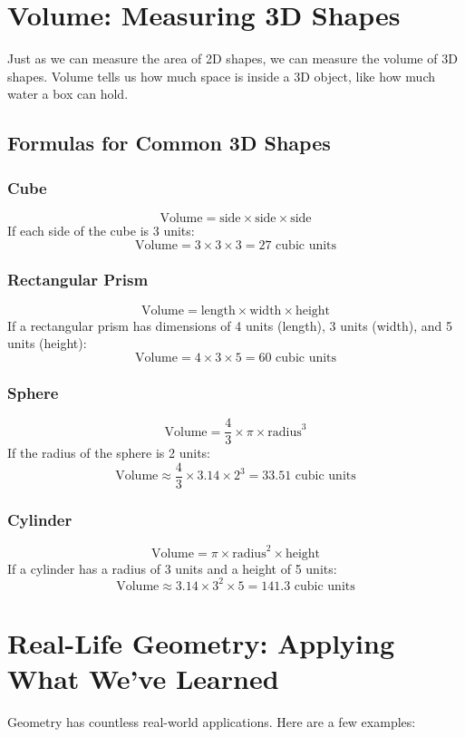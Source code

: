 \section{Volume: Measuring 3D Shapes}
Just as we can measure the area of 2D shapes, we can measure the volume of 3D shapes. Volume tells us how much space is inside a 3D object, like how much water a box can hold.

\subsection{Formulas for Common 3D Shapes}
\subsubsection{Cube}
\[
\text{Volume} = \text{side} \times \text{side} \times \text{side}
\]
If each side of the cube is 3 units:
\[
\text{Volume} = 3 \times 3 \times 3 = 27 \text{ cubic units}
\]

\subsubsection{Rectangular Prism}
\[
\text{Volume} = \text{length} \times \text{width} \times \text{height}
\]
If a rectangular prism has dimensions of 4 units (length), 3 units (width), and 5 units (height):
\[
\text{Volume} = 4 \times 3 \times 5 = 60 \text{ cubic units}
\]

\subsubsection{Sphere}
\[
\text{Volume} = \frac{4}{3} \times \pi \times \text{radius}^3
\]
If the radius of the sphere is 2 units:
\[
\text{Volume} \approx \frac{4}{3} \times 3.14 \times 2^3 = 33.51 \text{ cubic units}
\]

\subsubsection{Cylinder}
\[
\text{Volume} = \pi \times \text{radius}^2 \times \text{height}
\]
If a cylinder has a radius of 3 units and a height of 5 units:
\[
\text{Volume} \approx 3.14 \times 3^2 \times 5 = 141.3 \text{ cubic units}
\]

\section{Real-Life Geometry: Applying What We’ve Learned}
Geometry has countless real-world applications. Here are a few examples:

